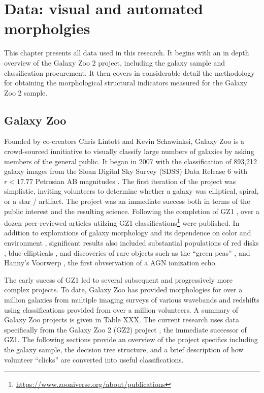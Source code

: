 
\chapter{Data: visual and automated morpholgies}
\label{chap:2}


This chapter presents all data used in this research. It begins with an in depth overview of the Galaxy Zoo 2 project, including the galaxy sample and classification procurement. It then covers in considerable detail the methodology for obtaining the morphological structural indicators measured for the Galaxy Zoo 2 sample. 


\section{Galaxy Zoo}
Founded by co-creators Chris Lintott and Kevin Schawinksi, Galaxy Zoo is a crowd-sourced innitiative to visually classify large numbers of galaxies by asking members of the general public. It began in 2007 with the classification of 893,212 galaxy images from the Sloan Digital Sky Survey (SDSS) Data Release 6 with $r < 17.77$ Petrosian AB magnitudes \cite{Strauss2002,Adelman2008}. The first iteration of the project was simplistic, inviting volunteers to determine whether a galaxy was elliptical, spiral, or a star / artifact. The project was an immediate success both in terms of the public interest and the resulting science. Following the completion of GZ1 \cite{Lintott2008}, over a dozen peer-reviewed articles utilzing GZ1 classifications\footnote{\url{https://www.zooniverse.org/about/publications}} were published. In addition to explorations of galaxy morphology and its dependence on color and environment \cite{Skibba2009, Bamford2009}, significant results also included substantial populations of red disks \cite{Masters2010b}, blue ellipticals \cite{Schawinski2009}, and discoveries of rare objects such as the ``green peas'' \cite{Cardamone2009}, and Hanny's Voorwerp \cite{Lintott2009}, the first obvservation of a AGN ionization echo. 

The early sucess of GZ1 led to several subsequent and progressively more complex projects. To date, Galaxy Zoo has provided morphologies for over a million galaxies from multiple imaging surveys of various wavebands and redshifts using classifications provided from over a million volunteers. A summary of Galaxy Zoo projects is given in Table XXX. The current research uses data specifically from the Galaxy Zoo 2 (GZ2) project \cite{Willett2013}, the immediate successor of GZ1. The following sections provide an overview of the project specifics including the galaxy sample, the decision tree structure, and a brief description of how volunteer ``clicks'' are converted into useful classifications. 


